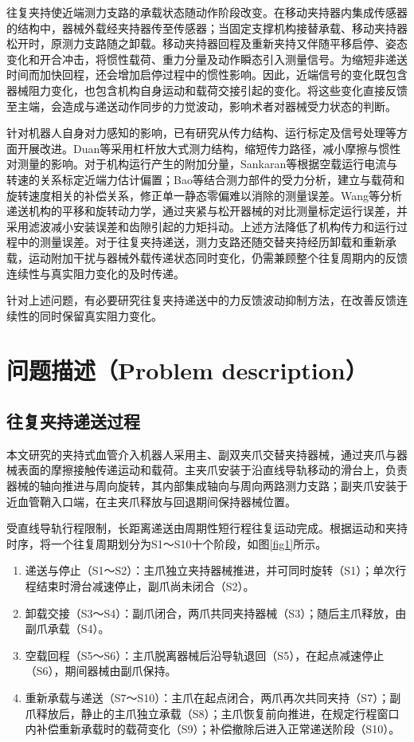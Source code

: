 \documentclass{JQR_LaTeX_Template-0507/JQRnew}
\providecommand{\RevisionColor}{\color{black}}
\newcommand{\revbegin}{\begingroup\RevisionColor}
\newcommand{\revend}{\par\endgroup}
\begin{document}
往复夹持使近端测力支路的承载状态随动作阶段改变。在移动夹持器内集成传感器的结构中，器械外载经夹持器传至传感器；当固定支撑机构接替承载、移动夹持器松开时，原测力支路随之卸载。移动夹持器回程及重新夹持又伴随平移启停、姿态变化和开合冲击，将惯性载荷、重力分量及动作瞬态引入测量信号。为缩短非递送时间而加快回程，还会增加启停过程中的惯性影响。因此，近端信号的变化既包含器械阻力变化，也包含机构自身运动和载荷交接引起的变化。将这些变化直接反馈至主端，会造成与递送动作同步的力觉波动，影响术者对器械受力状态的判断。

针对机器人自身对力感知的影响，已有研究从传力结构、运行标定及信号处理等方面开展改进。Duan等采用杠杆放大式测力结构，缩短传力路径，减小摩擦与惯性对测量的影响。对于机构运行产生的附加分量，Sankaran等根据空载运行电流与转速的关系标定近端力估计偏置；Bao等结合测力部件的受力分析，建立与载荷和旋转速度相关的补偿关系，修正单一静态零偏难以消除的测量误差。Wang等分析递送机构的平移和旋转动力学，通过夹紧与松开器械的对比测量标定运行误差，并采用滤波减小安装误差和齿隙引起的力矩抖动。上述方法降低了机构传力和运行过程中的测量误差。对于往复夹持递送，测力支路还随交替夹持经历卸载和重新承载，运动附加干扰与器械外载传递状态同时变化，仍需兼顾整个往复周期内的反馈连续性与真实阻力变化的及时传递。

针对上述问题，有必要研究往复夹持递送中的力反馈波动抑制方法，在改善反馈连续性的同时保留真实阻力变化。

\section{问题描述（Problem description）}

\subsection{往复夹持递送过程}

\revbegin
本文研究的夹持式血管介入机器人采用主、副双夹爪交替夹持器械，通过夹爪与器械表面的摩擦接触传递运动和载荷。主夹爪安装于沿直线导轨移动的滑台上，负责器械的轴向推进与周向旋转，其内部集成轴向与周向两路测力支路；副夹爪安装于近血管鞘入口端，在主夹爪释放与回退期间保持器械位置。
\revend

\revbegin
受直线导轨行程限制，长距离递送由周期性短行程往复运动完成。根据运动和夹持时序，将一个往复周期划分为S1～S10十个阶段，如图\ref{fig1}所示。
\begin{enumerate}[label=\arabic*),nosep,itemsep=0pt,topsep=2pt,partopsep=0pt,parsep=0pt,leftmargin=2\ccwd]
\item 递送与停止（S1～S2）：主爪独立夹持器械推进，并可同时旋转（S1）；单次行程结束时滑台减速停止，副爪尚未闭合（S2）。
\item 卸载交接（S3～S4）：副爪闭合，两爪共同夹持器械（S3）；随后主爪释放，由副爪承载（S4）。
\item 空载回程（S5～S6）：主爪脱离器械后沿导轨退回（S5），在起点减速停止（S6），期间器械由副爪保持。
\item 重新承载与递送（S7～S10）：主爪在起点闭合，两爪再次共同夹持（S7）；副爪释放后，静止的主爪独立承载（S8）；主爪恢复前向推进，在规定行程窗口内补偿重新承载时的载荷变化（S9）；补偿撤除后进入正常递送阶段（S10）。
\end{enumerate}
\revend
\end{document}

